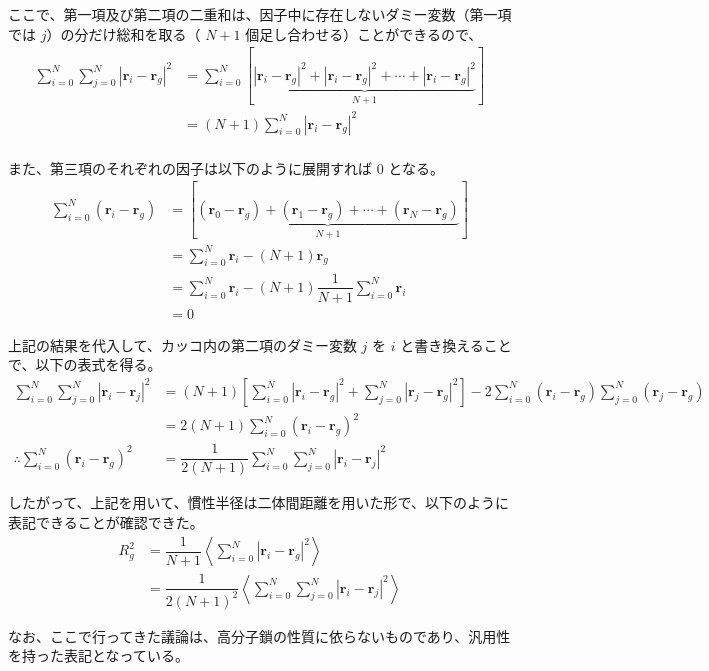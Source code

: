 \documentclass[11pt]{jsarticle}
\begin{document}
\begin{appendix}
ここで、第一項及び第二項の二重和は、因子中に存在しないダミー変数（第一項では $j$）の分だけ総和を取る（ $N+1$ 個足し合わせる）ことができるので、
\begin{align*}
\sum_{i = 0}^N \sum_{j=0}^N \left| \bm{r}_i - \bm{r}_g \right|^2 
	&= \sum_{i = 0}^N \left[ \underbrace{ \left| \bm{r}_i - \bm{r}_g \right|^2 + \left| \bm{r}_i - \bm{r}_g \right|^2 + \cdots + \left|\bm{r}_i - \bm{r}_g \right|^2 }_{N+1} \right]\\
	&= (N+1) \sum_{i = 0}^N \left| \bm{r}_i - \bm{r}_g \right|^2 \\
\end{align*}

また、第三項のそれぞれの因子は以下のように展開すれば 0 となる。
\begin{align*}
\sum_{i=0}^N (\bm{r}_i - \bm{r}_g) 
	&= \left[ \underbrace{ (\bm{r}_0 - \bm{r}_g) + (\bm{r}_1 - \bm{r}_g) + \cdots + (\bm{r}_N - \bm{r}_g) }_{N+1}\right] \\
	&= \sum_{i=0}^N \bm{r}_i -(N+1) \bm{r}_g \\
	&= \sum_{i=0}^N \bm{r}_i -(N+1) \dfrac{1}{N+1} \sum_{i=0}^{N} \bm{r}_i \\
	&=0
\end{align*}

上記の結果を代入して、カッコ内の第二項のダミー変数 $j$ を $i$ と書き換えることで、以下の表式を得る。
\begin{align*}
\sum_{i = 0}^N \sum_{j=0}^N \left| \bm{r}_i - \bm{r}_j \right|^2
	&= (N + 1) \left[ \sum_{i=0}^N \left| \bm{r}_i - \bm{r}_g \right|^2 + \sum_{j=0}^N \left| \bm{r}_j - \bm{r}_g \right|^2 \right] -2 \sum_{i=0}^N (\bm{r}_i - \bm{r}_g) \sum_{j=0}^N (\bm{r}_j - \bm{r}_g) \\
	&= 2(N + 1) \sum_{i=0}^N (\bm{r}_i- \bm{r}_g)^2 \\
\therefore \sum_{i=0}^N (\bm{r}_i- \bm{r}_g)^2 
	&= \dfrac{1}{2(N+1)} \sum_{i = 0}^N \sum_{j=0}^N \left| \bm{r}_i - \bm{r}_j \right|^2
\end{align*}

したがって、上記を用いて、慣性半径は二体間距離を用いた形で、以下のように表記できることが確認できた。
\begin{align*}
R_g^2 
	&= \dfrac{1}{N+1} \left\langle \sum_{i=0}^{N} |\bm{r}_i - \bm{r}_g|^2 \right\rangle \\
	&= \dfrac{1}{2(N+1)^2} \left \langle \sum_{i=0}^N \sum_{j=0}^N \left| \bm{r}_i - \bm{r}_j \right|^2 \right \rangle
\end{align*}

なお、ここで行ってきた議論は、高分子鎖の性質に依らないものであり、汎用性を持った表記となっている。


\end{appendix}
\end{document}
